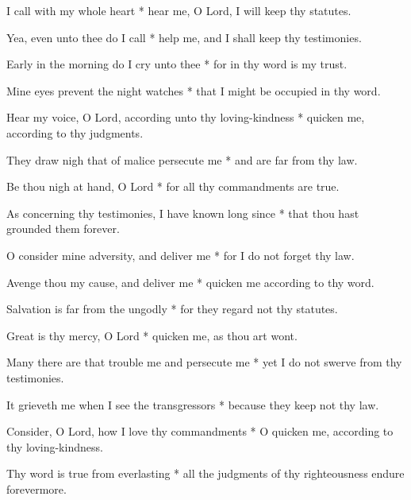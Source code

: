 I call with my whole heart * hear me, O Lord, I will keep thy statutes.

Yea, even unto thee do I call * help me, and I shall keep thy testimonies.

Early in the morning do I cry unto thee * for in thy word is my trust.

Mine eyes prevent the night watches * that I might be occupied in thy word.

Hear my voice, O Lord, according unto thy loving-kindness * quicken me, according to thy judgments.

They draw nigh that of malice persecute me * and are far from thy law.

Be thou nigh at hand, O Lord * for all thy commandments are true.

As concerning thy testimonies, I have known long since * that thou hast grounded them forever.

O consider mine adversity, and deliver me * for I do not forget thy law.

Avenge thou my cause, and deliver me * quicken me according to thy word.

Salvation is far from the ungodly * for they regard not thy statutes.

Great is thy mercy, O Lord * quicken me, as thou art wont.

Many there are that trouble me and persecute me * yet I do not swerve from thy testimonies.

It grieveth me when I see the transgressors * because they keep not thy law.

Consider, O Lord, how I love thy commandments * O quicken me, according to thy loving-kindness.

Thy word is true from everlasting * all the judgments of thy righteousness endure forevermore.